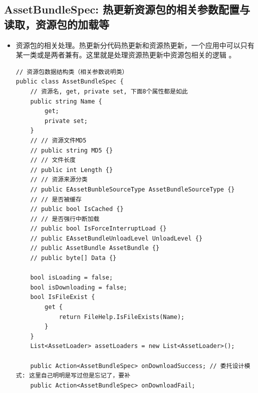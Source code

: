 \documentclass[9pt, b5paper]{article}
\begin{document}
\subsection{AssetBundleSpec: 热更新资源包的相关参数配置与读取，资源包的加载等}
\label{sec-7-2}
\begin{itemize}
\item 资源包的相关处理。热更新分代码热更新和资源热更新，一个应用中可以只有某一类或是两者兼有。这里就是处理资源热更新中资源包相关的逻辑 。
\begin{verbatim}
// 资源包数据结构类（相关参数说明类）
public class AssetBundleSpec {
    // 资源名, get, private set, 下面8个属性都是如此
    public string Name {
        get;
        private set;
    }
    // // 资源文件MD5
    // public string MD5 {}
    // // 文件长度
    // public int Length {}
    // // 资源来源分类
    // public EAssetBunbleSourceType AssetBundleSourceType {}
    // // 是否被缓存
    // public bool IsCached {}
    // // 是否强行中断加载
    // public bool IsForceInterruptLoad {}
    // public EAssetBundleUnloadLevel UnloadLevel {}
    // public AssetBundle AssetBundle {}
    // public byte[] Data {}

    bool isLoading = false;
    bool isDownloading = false;
    bool IsFileExist {
        get {
            return FileHelp.IsFileExists(Name);
        }
    }
    List<AssetLoader> assetLoaders = new List<AssetLoader>();

    public Action<AssetBundleSpec> onDownloadSuccess; // 委托设计模式: 这里自己明明是写过但是忘记了，要补
    public Action<AssetBundleSpec> onDownloadFail;


\end{verbatim}
\end{itemize}
\end{document}
